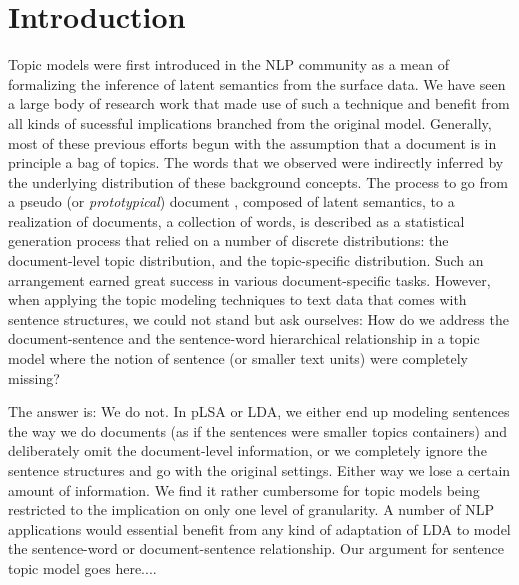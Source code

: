 \begin{abstract}
{ \color{red} (Page 1, top) Here we summarize the contribution of this work.
Supposedly, this work is regarded as an application of topic models over the
sentence level. }

\end{abstract}

\section{Introduction}

Topic models were first introduced in the NLP community as a mean of
formalizing the inference of latent semantics from the surface data.  We have
seen a large body of research work that made use of such a technique and
benefit from all kinds of sucessful implications branched from the original
model.  Generally, most of these previous efforts begun with the assumption
that a document is in principle a bag of topics.  The words that we observed
were indirectly inferred by the underlying distribution of these background
concepts.  The process to go from a pseudo (or {\it prototypical}) document ,
composed of latent semantics, to a realization of documents, a collection of
words, is described as a statistical generation process that relied on a number
of discrete distributions: the document-level topic distribution, and the
topic-specific distribution.  Such an arrangement earned great success in
various document-specific tasks.  However, when applying the topic modeling
techniques to text data that comes with sentence structures, we could not stand
but ask ourselves: How do we address the document-sentence and the
sentence-word hierarchical relationship in a topic model where the notion of
sentence (or smaller text units) were completely missing?  

The answer is: We do not.  In pLSA or LDA, we either end up modeling sentences
the way we do documents (as if the sentences were smaller topics containers)
and deliberately omit the document-level information, or we completely ignore
the sentence structures and go with the original settings.  Either way we lose
a certain amount of information.  We find it rather cumbersome for topic models
being restricted to the implication on only one level of granularity.  A number
of NLP applications would essential benefit from any kind of adaptation of LDA
to model the sentence-word or document-sentence relationship. {\color{red} Our argument for sentence topic model goes here...}.

